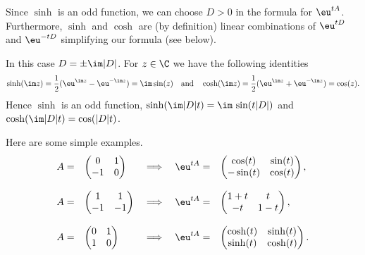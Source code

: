 \begin{description}[wide,  labelindent=0em]

\item[$D^2 > 0$: ]
Since $ \sinh $  is an odd function, we can choose  $ D > 0 $ in the formula for $  \eu^{tA} $.
Furthermore, $ \sinh $ and $ \cosh $ are (by definition) linear combinations of\/ $  \eu^{tD} $ and 
$  \eu^{-tD} $ simplifying our formula (see below).

\item[$D^2 < 0$: ] 
In this case $D = \pm \im|D|$.
For $ z \in \C $ we have the following identities
%
\[
	\sinh(\im z) = \frac{1}{2}(  \eu^{\im z} -  \eu^{-\im z}) = \im \sin(z)
	\quad \text{and} \quad
	\cosh(\im z) = \frac{1}{2}(  \eu^{ \im z} +  \eu^{- \im z}) = \cos(z). 
\]
%
Hence $ \sinh $ is an odd function,  $\sinh(\im |D| t ) = \im \, \sin(t|D|)$ and 
$\cosh(\im |D| t ) = \cos(|D| t )$.
\end{description}
Here are some simple examples.
\newcommand{\ABC}{\begin{pmatrix}	0 & 1 \\ -1 & 0	\end{pmatrix}}
\newcommand{\BBC}{\begin{pmatrix}	\cos(t) & \sin(t) \\ - \sin(t) & \cos(t) \end{pmatrix}}
\newcommand{\CBC}{\begin{pmatrix}	1 & 1 \\ -1 & -1 \end{pmatrix}}
\newcommand{\DBC}{\begin{pmatrix}	1+t & t \\ - t & 1-t \end{pmatrix}}
\newcommand{\EBC}{\begin{pmatrix}	0 & 1 \\ 1 &0 \end{pmatrix}}
\newcommand{\FBC}{\begin{pmatrix}	\cosh(t) & \sinh(t) \\ \sinh(t) & \cosh(t) \end{pmatrix}}
\[
  \begin{array}{lllll}
    A= & \ABC & \implies &  \eu^{tA}= & \BBC , \\\\
    A= & \CBC & \implies &  \eu^{tA}= & \DBC , \\\\ 
    A= & \EBC & \implies &  \eu^{tA}= & \FBC  .
  \end{array}
\]
